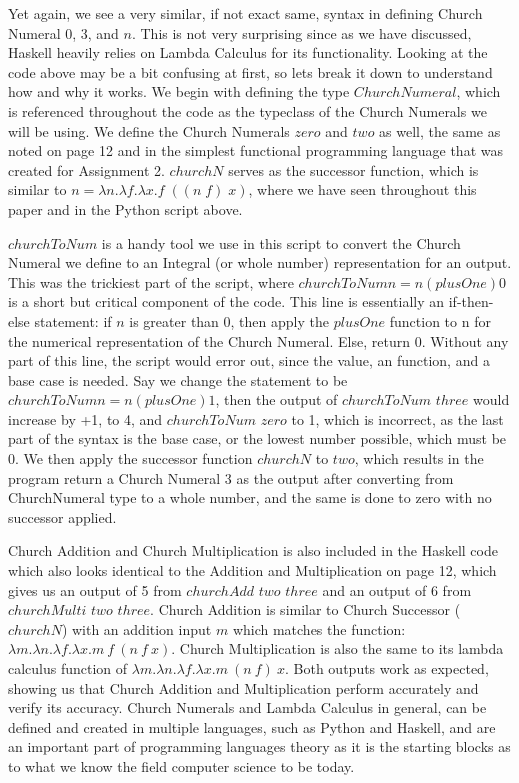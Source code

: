 \documentclass{article}
\begin{document}
\noindent
Yet again, we see a very similar, if not exact same, syntax in defining Church Numeral 0, 3, and $n$. This is not very surprising since as we have discussed, Haskell heavily relies on Lambda Calculus for its functionality. Looking at the code above may be a bit confusing at first, so lets break it down to understand how and why it works. We begin with defining the type $ChurchNumeral$, which is referenced throughout the code as the typeclass of the Church Numerals we will be using. We define the Church Numerals $zero$ and $two$ as well, the same as noted on page 12 and in the simplest functional programming language that was created for Assignment 2. $churchN$ serves as the successor function, which is similar to $ n = \lambda n. \lambda f. \lambda x.f \; ((n \; f) \; x)$, where we have seen throughout this paper and in the Python script above.

\medskip\noindent
$churchToNum$ is a handy tool we use in this script to convert the Church Numeral we define to an Integral (or whole number) representation for an output. This was the trickiest part of the script, where $churchToNum n = n (plusOne) 0$ is a short but critical component of the code. This line is essentially an if-then-else statement: if $n$ is greater than 0, then apply the $plusOne$ function to n for the numerical representation of the Church Numeral. Else, return 0. Without any part of this line, the script would error out, since the value, an function, and a base case is needed. Say we change the statement to be $churchToNum n = n (plusOne) 1$, then the output of $churchToNum$ $three$ would increase by +1, to 4, and $churchToNum$ $zero$ to 1, which is incorrect, as the last part of the syntax is the base case, or the lowest number possible, which must be 0. We then apply the successor function $churchN$ to $two$, which results in the program return a Church Numeral 3 as the output after converting from ChurchNumeral type to a whole number, and the same is done to zero with no successor applied. 

\medskip\noindent
Church Addition and Church Multiplication is also included in the Haskell code which also looks identical to the Addition and Multiplication on page 12, which gives us an output of 5 from $churchAdd$ $two$ $three$ and an output of 6 from $churchMulti$ $two$ $three$. Church Addition is similar to Church Successor ($churchN$) with an addition input $m$ which matches the function: $\lambda m.\lambda n.\lambda f.\lambda x. m\ f\ (n\ f\ x)$. Church Multiplication is also the same to its lambda calculus function of $\lambda m.\lambda n.\lambda f.\lambda x.m\ (n\ f) \ x $. Both outputs work as expected, showing us that Church Addition and Multiplication perform accurately and verify its accuracy. Church Numerals and Lambda Calculus in general, can be defined and created in multiple languages, such as Python and Haskell, and are an important part of programming languages theory as it is the starting blocks as to what we know the field computer science to be today.
\end{document}
